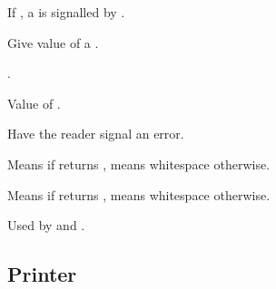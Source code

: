 \begin{LIST}{1cm}
  If \NIL, a  is signalled by .

  \index{\#=}%
  Give value of  a .

  \index{\#\#}%
  .

  Value of .

  \IT{\KWD{\#\boldmath$<$}}
  Have the reader signal an error.

  Means  if  returns \T, means whitespace
  otherwise. 

  Means  if  returns \NIL, means whitespace
  otherwise. 

  Used by \kwd{\#+} and \kwd{\#--}.

\end{LIST}


\subsection{Printer} 


